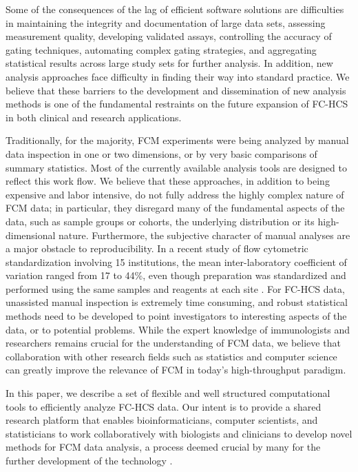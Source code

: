 \documentclass[10pt]{bmc_article}
\newenvironment{bmcformat}{\begin{raggedright}\baselineskip20pt\sloppy\setboolean{publ}{false}}{\end{raggedright}\baselineskip20pt\sloppy}
\begin{document}
\begin{bmcformat}
Some of the consequences of the lag of efficient software solutions
are difficulties in maintaining the integrity and documentation of
large data sets, assessing measurement quality, developing validated
assays, controlling the accuracy of gating techniques, automating
complex gating strategies, and aggregating statistical results across
large study sets for further analysis. In addition, new analysis
approaches face difficulty in finding their way into standard
practice. We believe that these barriers to the development and
dissemination of new analysis methods is one of the fundamental
restraints on the future expansion of FC-HCS in both clinical and
research applications.

Traditionally, for the majority, FCM experiments were being analyzed
by manual data inspection in one or two dimensions, or by very basic
comparisons of summary statistics. Most of the currently available
analysis tools are designed to reflect this work flow.  We believe
that these approaches, in addition to being expensive and labor
intensive, do not fully address the highly complex nature of FCM data;
in particular, they disregard many of the fundamental aspects of the
data, such as sample groups or cohorts, the underlying distribution or
its high-dimensional nature. Furthermore, the subjective character of
manual analyses are a major obstacle to reproducibility. In a recent
study of flow cytometric standardization involving 15 institutions,
the mean inter-laboratory coefficient of variation ranged from 17 to
44\%, even though preparation was standardized and performed using the
same samples and reagents at each site \cite{Maecker2005}. For FC-HCS
data, unassisted manual inspection is extremely time consuming, and
robust statistical methods need to be developed to point investigators
to interesting aspects of the data, or to potential problems. While
the expert knowledge of immunologists and researchers remains crucial
for the understanding of FCM data, we believe that collaboration with
other research fields such as statistics and computer science can
greatly improve the relevance of FCM in today's high-throughput
paradigm.

In this paper, we describe a set of flexible and well structured
computational tools to efficiently analyze FC-HCS data. Our intent is
to provide a shared research platform that enables bioinformaticians,
computer scientists, and statisticians to work collaboratively with
biologists and clinicians to develop novel methods for FCM data
analysis, a process deemed crucial by many for the further development
of the technology \cite{lizard2007fca}.


\end{bmcformat}
\end{document}
